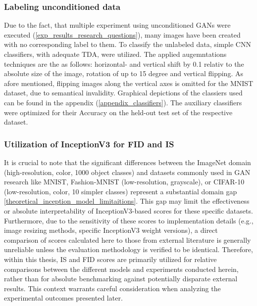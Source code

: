 \subsubsection{Labeling unconditioned data}\label{body_experiment_labeling_data}
Due to the fact, that multiple experiment using unconditioned GANs were executed (\ref{exp_results_research_questions}), many images have been created with no corresponding label to them. To classify the unlabeled data, simple CNN classifiers, with adequate TDA, were utilized. The applied augemntations techniques are the as follows: horizontal- and vertical shift by 0.1 relativ to the absolute size of the image, rotation of up to 15 degree and vertical flipping. As afore mentioned, flipping images along the vertical axes is omitted for the MNIST dataset, due to semantical invalidity. Graphical depictions of the classiers used can be found in the appendix (\ref{appendix_classifiers}). The auxiliary classifiers were optimized for their Accuracy on the held-out test set of the respective dataset.\\


\subsubsection{Utilization of InceptionV3 for FID and IS}\label{body_experiment_inception_model}
It is crucial to note that the significant differences between the ImageNet domain (high-resolution, color, 1000 object classes) and datasets commonly used in GAN research like MNIST, Fashion-MNIST (low-resolution, grayscale), or CIFAR-10 (low-resolution, color, 10 simpler classes) represent a substantial domain gap \ref{theoretical_inception_model_limitaitions}. This gap may limit the effectiveness or absolute interpretability of InceptionV3-based scores for these specific datasets. Furthermore, due to the sensitivity of these scores to implementation details (e.g., image resizing methods, specific InceptionV3 weight versions), a direct comparison of scores calculated here to those from external literature is generally unreliable unless the evaluation methodology is verified to be identical. Therefore, within this thesis, IS and FID scores are primarily utilized for relative comparisons between the different models and experiments conducted herein, rather than for absolute benchmarking against potentially disparate external results. This context warrants careful consideration when analyzing the experimental outcomes presented later.


